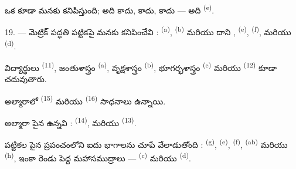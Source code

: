 ఒక  కూడా మనకు కనిపిస్తుంది; అది  కాదు,  కాదు,
 కాదు — అది  \textsuperscript{(e)}.

19. --- మెట్రిక్ పద్ధతి పట్టికపై మనకు కనిపించేవి :  \textsuperscript{(a)},
 \textsuperscript{(b)} మరియు దాని , 
\textsuperscript{(e)},  \textsuperscript{(f)},  మరియు
 \textsuperscript{(d)}.

విద్యార్థులు  \textsuperscript{(11)}, జంతుశాస్త్రం
\textsuperscript{(a)}, వృక్షశాస్త్రం \textsuperscript{(b)}, భూగర్భశాస్త్రం
\textsuperscript{(c)} మరియు  \textsuperscript{(12)} కూడా చదువుతారు.

అల్మారాలో  \textsuperscript{(15)} మరియు 
\textsuperscript{(16)} సాధనాలు ఉన్నాయి.

అల్మారా పైన ఉన్నవి :  \textsuperscript{(14)},  మరియు
 \textsuperscript{(13)}.

పట్టికల పైన ప్రపంచంలోని ఐదు భాగాలను చూపే  వేలాడుతోంది : 
\textsuperscript{(g)},  \textsuperscript{(e)}, 
\textsuperscript{(f)},  \textsuperscript{(ab)} మరియు 
\textsuperscript{(h)}, ఇంకా రెండు పెద్ద మహాసముద్రాలు —  \textsuperscript{(c)}
మరియు  \textsuperscript{(d)}.

\VUsaut{6.0mm}
\VUfilet{22mm}
